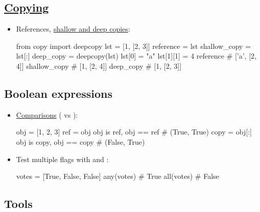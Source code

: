 \documentclass[rules]{cheatsheet}
\begin{document}
\subsection{\href{https://realpython.com/copying-python-objects/}{Copying}}

\begin{itemize}
  \item References, \href{https://docs.python.org/3/library/copy.html}{shallow and deep copies}:
  \begin{python}[gobble=4]
    from copy import deepcopy
    lst = [1, [2, 3]]
    reference = lst
    shallow_copy = lst[:]
    deep_copy = deepcopy(lst)
    lst[0] = "a"
    lst[1][1] = 4
    reference # ['a', [2, 4]]
    shallow_copy # [1, [2, 4]]
    deep_copy # [1, [2, 3]]
  \end{python}
\end{itemize}

\subsection{Boolean expressions}

\begin{itemize}
  \item \href{https://docs.python.org/3/library/stdtypes.html#comparisons}{Comparisons} ( vs \pyinline{==}):
  \begin{python}[gobble=4]
    obj = [1, 2, 3]
    ref = obj
    obj is ref, obj == ref # (True, True)
    copy = obj[:]
    obj is copy, obj == copy # (False, True)
  \end{python}

  \item Test multiple flags with \href{https://docs.python.org/3/library/functions.html#any}{} and \href{https://docs.python.org/3/library/functions.html#all}{}:
  \begin{python}[gobble=4]
    votes = [True, False, False]
    any(votes) # True
    all(votes) # False
  \end{python}
\end{itemize}

\subsection{Tools}
\end{document}
